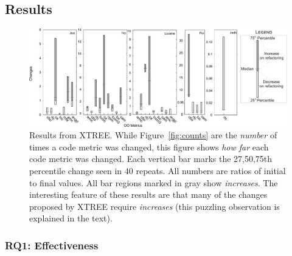 \documentclass{sig-alternate}
\newcommand{\fig}[1]{Figure~\ref{fig:#1}}
\newcommand{\quart}[4]{\begin{picture}(80,4)%
{\color{black}\put(#3,2){\circle*{4}}\put(#1,2){\line(1,0){#2}}}\end{picture}}
\theoremstyle{break}
\begin{document}
\begin{itemize}


 \newpage
\subsection{Results}
 
 
\begin{figure}[!t]
\centering
\includegraphics[width=\linewidth]{figs/changes01.png}
\caption{Results  from XTREE.
While \fig{counts} are the {\em number} of times a code metric was changed,
this  figure shows {\em how far} each code metric was changed. Each vertical bar
marks the 27,50,75th percentile change seen in 40 repeats.
All numbers are ratios of initial to final values.
All bar regions marked in gray show {\em increases}.
The interesting feature of these results are that many
of the changes proposed by XTREE require {\em increases}
(this puzzling observation is explained in the text).}
\label{fig:changes}
\end{figure}

\subsubsection{RQ1: Effectiveness}


\end{itemize}
\end{document}
